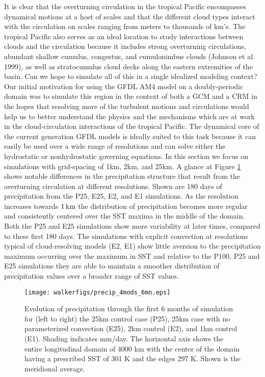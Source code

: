 \documentclass[11pt]{article}   	%
\begin{document}
It is clear that the overturning circulation in the tropical Pacific encompasses dynamical motions at a host of scales and that the 
different cloud types interact with the circulation on scales ranging from meters to thousands of km's.  
The tropical Pacific also serves as an ideal location to study interactions between clouds and the 
circulation because it includes strong overturning circulations, abundant shallow cumulus, congestus, and cumulonimbus 
clouds (Johnson et al. 1999), as well as stratocumulus cloud decks along the eastern extremities of the basin.
Can we hope to simulate all of this in a single idealized modeling context?    
Our initial motivation for using the GFDL AM4 model on a doubly-periodic domain was to simulate this region 
in the context of both a GCM and a CRM in the hopes that resolving more of the turbulent motions and circulations
would help us to better understand the physics and the mechanisms which are at work in the cloud-circulation
interactions of the tropical Pacific.    
The dynamical core of the current generation GFDL models is ideally suited to this task because it can easily 
be used over a wide range of resolutions and can solve either the hydrostatic or nonhydrostatic 
governing equations.  In this section we focus on simulations with grid-spacing of 1km, 2km, and 25km.   
A glance at Figure \ref{fig:hov_4mods_6mn} shows notable differences in the precipitation structure that result from the 
overturning circulation at different resolutions.  Shown are 180 days of precipitation from the P25, E25, E2, and 
E1 simulations.  As the 
resolution increases towards $1 \, \rm{km}$ the distribution of precipitation becomes more regular and consistently 
centered over the SST maxima in the middle of the domain.  Both the P25 and E25 simulations show more 
variability at later 
times, compared to these first 180 days.  The simulations with explicit convection at resolutions typical of 
cloud-resolving 
models (E2, E1) show little aversion to the precipitation maximum occurring over the maximum in SST and relative to 
the P100, P25 and E25 simulations 
they are able to maintain a smoother distribution of  precipitation values over a broader range of SST values.    

\begin{figure}
  \texttt{[image: walkerfigs/precip\_4mods\_6mn.eps]}
  \caption{Evolution of precipitation through the first 6 months of simulation for (left to right) the 25km control case (P25), 
  25km case with no parameterized convection (E25), 2km control (E2), and 1km control (E1).  
  Shading indicates mm/day.  The horizontal axis shows the entire 
  longitudinal domain of 4000 km with the center of the domain having a prescribed SST of 301 K and the edges 297 K.  
  Shown is the meridional average. }
  \label{fig:hov_4mods_6mn}
\end{figure}
\end{document}
